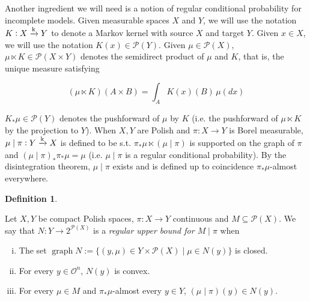 \documentclass[11pt]{article}
\theoremstyle{definition}
\newtheorem{definition}{Definition}%
\theoremstyle{plain}
\newcommand{\M}{\xrightarrow{\textnormal{k}}}
\DeclareMathOperator{\Gr}{graph}
\newcommand{\PM}{\mathcal{P}}
\newcommand{\Ob}{\mathcal{O}}
\begin{document}
Another ingredient we will need is a notion of regular conditional probability for incomplete models. Given measurable spaces $X$ and $Y$, we will use the notation $K: X \M Y$ to denote a Markov kernel with source $X$ and target $Y$. Given $x \in X$, we will use the notation $K\left(x\right) \in \PM\left(Y\right)$. Given $\mu \in \PM\left(X\right)$, $\mu \ltimes K \in \PM\left(X \times Y\right)$ denotes the semidirect product of $\mu$ and $K$, that is, the unique measure satisfying

\begin{equation}
(\mu \ltimes K)(A \times B) = \int_A K(x)(B)\, \mu(dx)
\end{equation} 

$K_* \mu \in \PM\left(Y\right)$ denotes the pushforward of $\mu$ by $K$ (i.e. the pushforward of $\mu \ltimes K$ by the projection to $Y$). When $X,Y$ are Polish and $\pi: X \rightarrow Y$ is Borel measurable, $\mu \mid \pi: Y \M X$ is defined to be s.t. $\pi_* \mu \ltimes \left(\mu \mid \pi\right)$ is supported on the graph of $\pi$ and $\left(\mu \mid \pi\right)_* \pi_* \mu = \mu$ (i.e. $\mu \mid \pi$ is a regular conditional probability). By the disintegration theorem, $\mu \mid \pi$ exists and is defined up to coincidence $\pi_* \mu$-almost everywhere.
%

\begin{samepage}
\begin{definition}
\label{def:update_incomplete}

Let $X,Y$ be compact Polish spaces, $\pi: X \rightarrow Y$ continuous and $M \subseteq \PM(X)$. We say that $N: Y \rightarrow 2^{\PM(X)}$ is a \emph{regular upper bound for $M \mid \pi$} when 
%
\begin{enumerate}[i.]
\item\label{con:def__update_incomplete__clos} The set $\Gr{N}:=\{(y,\mu)\in Y\times\PM(X) \mid \mu \in N(y)\}$ is closed.
\item\label{con:def__update_incomplete__conv} For every $y \in \Ob^n$, $N(y)$ is convex.
\item\label{con:def__update_incomplete__cond} For every $\mu \in M$ and $\pi_*\mu$-almost every $y \in Y$, $(\mu \mid \pi)(y) \in N(y)$.
\end{enumerate}

\end{definition}
\end{samepage}
\end{document}
